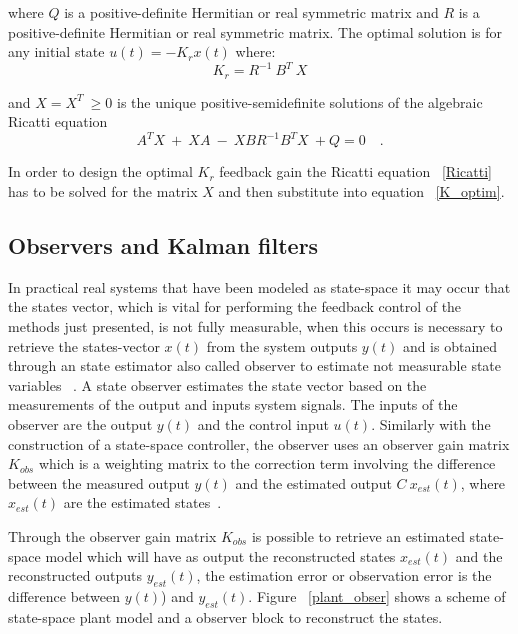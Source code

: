 where $Q$ is a positive-definite Hermitian or real symmetric matrix and $R$ is a positive-definite Hermitian or real symmetric matrix. The optimal solution is for any initial state $u(t)=-K_rx(t)$ where:
\begin{equation}
K_r=R^{-1}~B^T~X
\label{K_optim}
\end{equation}

and $X=X^T~\geq 0$ is the unique positive-semidefinite solutions of the algebraic Ricatti equation
\begin{equation}
A^TX~+~XA~-~XBR^{-1}B^TX~+Q=0\quad.
\label{Ricatti}
\end{equation}

In order to design the optimal $K_r$ feedback gain the Ricatti equation ~\ref{Ricatti} has to be solved for the matrix $X$ and then substitute into equation ~\ref{K_optim}.


\subsection{Observers and Kalman filters}

In practical real systems that have been modeled as state-space  it may occur that the states vector, which is vital for performing the feedback control of the methods just presented, is not fully measurable, when this occurs is necessary to retrieve the states-vector $x(t)$ from the  system outputs $y(t)$ and  is obtained through an state estimator also called observer to estimate not measurable state variables ~\cite[Chapter~8]{Chen1999}. A state observer estimates the state vector based on the measurements of the output  and inputs system signals. The inputs of the observer are the output $y(t)$ and the control input $u(t)$. Similarly with the construction of a state-space controller, the observer uses an observer gain matrix $K_{obs}$ which is a weighting matrix to the correction term involving the difference between the measured output $y(t)$ and the estimated output $C~x_{est}(t)$, where $x_{est}(t)$ are the estimated states~\cite[Chapter~10]{Ogata2009}. 
\smallskip

Through the observer gain matrix $K_{obs}$ is possible to retrieve an estimated state-space model which will have as output the reconstructed states $x_{est}(t)$ and the reconstructed outputs $y_{est}(t)$, the estimation error or observation error is the difference between $y(t)$) and $y_{est}(t)$. Figure ~\ref{plant_obser} shows a scheme of state-space plant model and a observer block to reconstruct the states. 
\smallskip

